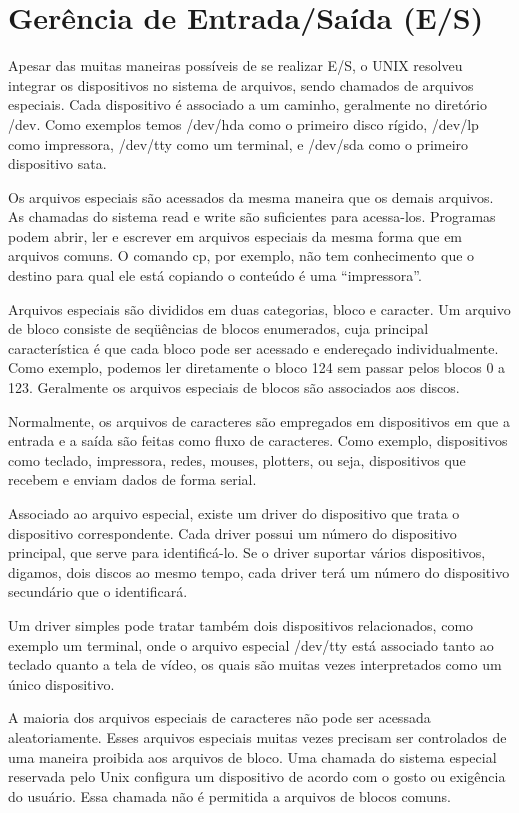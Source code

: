 \chapter{Gerência de Entrada/Saída (E/S)}

Apesar das muitas maneiras possíveis de se realizar E/S, o UNIX resolveu integrar os dispositivos no sistema de arquivos, sendo chamados de arquivos especiais. Cada dispositivo é associado a um caminho, geralmente no diretório /dev. Como exemplos temos /dev/hda como o primeiro disco rígido, /dev/lp como impressora, /dev/tty como um terminal, e /dev/sda como o primeiro dispositivo sata.

Os arquivos especiais são acessados da mesma maneira que os demais arquivos. As chamadas do sistema read e write são suficientes para acessa-los. Programas podem abrir, ler e escrever em arquivos especiais da mesma forma que em arquivos comuns. O comando cp, por exemplo, não tem conhecimento que o destino para qual ele está copiando o conteúdo é uma “impressora”.

Arquivos especiais são divididos em duas categorias, bloco e caracter. Um arquivo de bloco consiste de seqüências de blocos enumerados, cuja principal característica é que cada bloco pode ser acessado e endereçado individualmente. Como exemplo, podemos ler diretamente o bloco 124 sem passar pelos blocos 0 a 123. Geralmente os arquivos especiais de blocos são associados aos discos.

Normalmente, os arquivos de caracteres são empregados em dispositivos em que a entrada e a saída são feitas como fluxo de caracteres. Como exemplo, dispositivos como teclado, impressora, redes, mouses, plotters, ou seja, dispositivos que recebem e enviam dados de forma serial.

Associado ao arquivo especial, existe um driver do dispositivo que trata o dispositivo correspondente. Cada driver possui um número do dispositivo principal, que serve para identificá-lo. Se o driver suportar vários dispositivos, digamos, dois discos ao mesmo tempo, cada driver terá um número do dispositivo secundário que o identificará.

Um driver simples pode tratar também dois dispositivos relacionados, como exemplo um terminal, onde o arquivo especial /dev/tty está associado tanto ao teclado quanto a tela de vídeo, os quais são muitas vezes interpretados como um único dispositivo.

A maioria dos arquivos especiais de caracteres não pode ser acessada aleatoriamente. Esses arquivos especiais muitas vezes precisam ser controlados de uma maneira proibida aos arquivos de bloco. Uma chamada do sistema especial reservada pelo Unix configura um dispositivo de acordo com o gosto ou exigência do usuário. Essa chamada não é permitida a arquivos de blocos comuns.

